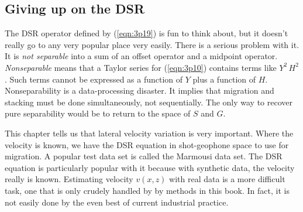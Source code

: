 \subsection{Giving up on the DSR}
\par
The DSR operator
defined by (\ref{eqn:3p19})
is fun to think about,
but it doesn't really go
to any very popular place very easily.
There is a serious problem with it.
It is {\em not separable }
into a sum of an offset operator and a midpoint operator.
{\em  Nonseparable}
means that a Taylor series for (\ref{eqn:3p10})
contains terms like $ Y^2 \, H^2 $.
Such terms cannot be expressed as a function of  $Y$  plus a function of  $H$.
Nonseparability is a data-processing disaster.
It implies that migration and stacking must be done simultaneously,
not sequentially.
The only way to recover pure separability would be
to return to the space of  $S$  and  $G$.

\par
This chapter tells us that lateral velocity variation
is very important.
Where the velocity is known,
we have the DSR equation in shot-geophone
space to use for migration.
A popular test data set is called the Marmousi data set.
The DSR equation is particularly popular with it
because with synthetic data, the velocity really is known.
Estimating velocity $v(x,z)$ with
real data is a more difficult task,
one that is only crudely handled by
by methods in this book.
In fact, it is not easily done by the even best
of current industrial practice.


